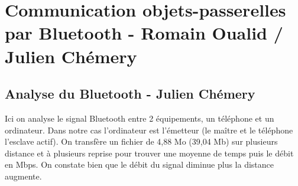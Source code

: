 \documentclass[12]{article}
\begin{document}
\newpage
\section{Communication objets-passerelles par Bluetooth - Romain Oualid / Julien Chémery}



\subsection{Analyse du Bluetooth - Julien Chémery}

Ici on analyse le signal Bluetooth entre 2 équipements, un téléphone et un ordinateur. Dans notre cas l'ordinateur est l'émetteur (le maître et le téléphone l'esclave actif). On transfère un fichier de 4,88 Mo (39,04 Mb) sur plusieurs distance et à plusieurs reprise pour trouver une moyenne de temps puis le débit en Mbps. On constate bien que le débit du signal diminue plus la distance augmente. 
\end{document}
